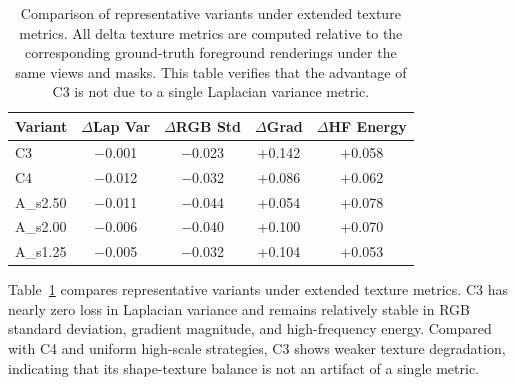 \documentclass[times,twocolumn,final]{elsarticle}
\providecommand{\DIFadd}[1]{{\protect\color{blue} \sf #1}} %
\providecommand{\DIFaddbegin}{} %
\providecommand{\DIFaddend}{} %
\providecommand{\DIFaddFL}[1]{\DIFadd{#1}} %
\providecommand{\DIFaddbeginFL}{} %
\providecommand{\DIFaddendFL}{} %
\providecommand{\DIFdelbeginFL}{} %
\providecommand{\DIFdelendFL}{} %
\newcommand{\DIFscaledelfig}{0.5}
\newlength{\DIFdelgraphicswidth} %
\newlength{\DIFdelgraphicsheight} %
\newcommand{\DIFaddincludegraphics}[2][]{{\color{blue}\fbox{\DIFOincludegraphics[#1]{#2}}}} %
\newcommand{\DIFdelincludegraphics}[2][]{%
\sbox{\DIFdelgraphicsbox}{\DIFOincludegraphics[#1]{#2}}%
\settoboxwidth{\DIFdelgraphicswidth}{\DIFdelgraphicsbox} %
\settoboxtotalheight{\DIFdelgraphicsheight}{\DIFdelgraphicsbox} %
\scalebox{\DIFscaledelfig}{%
\parbox[b]{\DIFdelgraphicswidth}{\usebox{\DIFdelgraphicsbox}\\[-\baselineskip] \rule{\DIFdelgraphicswidth}{0em}}\llap{\resizebox{\DIFdelgraphicswidth}{\DIFdelgraphicsheight}{%
\setlength{\unitlength}{\DIFdelgraphicswidth}%
\begin{picture}(1,1)%
\thicklines\linethickness{2pt} %
{\color[rgb]{1,0,0}\put(0,0){\framebox(1,1){}}}%
{\color[rgb]{1,0,0}\put(0,0){\line( 1,1){1}}}%
{\color[rgb]{1,0,0}\put(0,1){\line(1,-1){1}}}%
\end{picture}%
}\hspace*{3pt}}} %
} %
\DeclareRobustCommand{\DIFaddbegin}{\DIFOaddbegin \let\includegraphics\DIFaddincludegraphics} %
\DeclareRobustCommand{\DIFaddend}{\DIFOaddend \let\includegraphics\DIFOincludegraphics} %
\DeclareRobustCommand{\DIFaddbeginFL}{\DIFOaddbeginFL \let\includegraphics\DIFaddincludegraphics} %
\DeclareRobustCommand{\DIFaddendFL}{\DIFOaddendFL \let\includegraphics\DIFOincludegraphics} %
\DeclareRobustCommand{\DIFdelbeginFL}{\DIFOdelbeginFL \let\includegraphics\DIFdelincludegraphics} %
\DeclareRobustCommand{\DIFdelendFL}{\DIFOaddendFL \let\includegraphics\DIFOincludegraphics} %
\begin{document}
\FloatBarrier

\begin{table}[h!]
\centering
\caption{Comparison of representative variants under extended texture metrics. All delta texture metrics are computed relative to the corresponding ground-truth foreground renderings under the same views and masks. This table verifies that the advantage of C3 is not due to a single Laplacian variance metric.}
\label{tab:extended}
\DIFdelbeginFL %
\DIFdelendFL \DIFaddbeginFL \small
\begin{tabular}{lcccc}
\toprule
\DIFaddFL{Variant }& \DIFaddFL{$\Delta$Lap Var }& \DIFaddFL{$\Delta$RGB Std }& \DIFaddFL{$\Delta$Grad }& \DIFaddFL{$\Delta$HF Energy }\\
\midrule
\DIFaddFL{C3 }& \DIFaddFL{$-$0.001 }& \DIFaddFL{$-$0.023 }& \DIFaddFL{+0.142 }& \DIFaddFL{+0.058 }\\
\DIFaddFL{C4 }& \DIFaddFL{$-$0.012 }& \DIFaddFL{$-$0.032 }& \DIFaddFL{+0.086 }& \DIFaddFL{+0.062 }\\
\DIFaddFL{A\_s2.50 }& \DIFaddFL{$-$0.011 }& \DIFaddFL{$-$0.044 }& \DIFaddFL{+0.054 }& \DIFaddFL{+0.078 }\\
\DIFaddFL{A\_s2.00 }& \DIFaddFL{$-$0.006 }& \DIFaddFL{$-$0.040 }& \DIFaddFL{+0.100 }& \DIFaddFL{+0.070 }\\
\DIFaddFL{A\_s1.25 }& \DIFaddFL{$-$0.005 }& \DIFaddFL{$-$0.032 }& \DIFaddFL{+0.104 }& \DIFaddFL{+0.053 }\\
\bottomrule
\end{tabular}
\DIFaddendFL \end{table}

\DIFaddbegin \DIFadd{Table~\ref{tab:extended} compares representative variants under extended texture metrics. }\DIFaddend C3 has nearly zero loss in Laplacian variance and remains relatively stable in RGB standard deviation, gradient magnitude, and high-frequency energy. Compared with C4 and uniform high-scale strategies, C3 shows weaker texture degradation, indicating that its shape-texture balance is not an artifact of a single metric.
\end{document}
